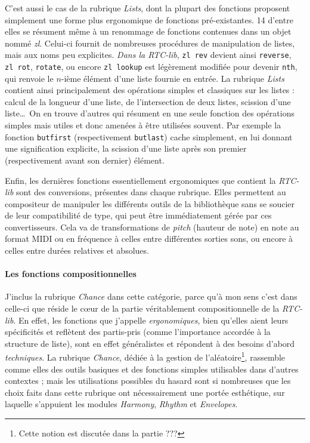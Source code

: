 \documentclass[a4paper,12pt]{article}
\begin{document}
C'est aussi le cas de la rubrique \emph{Lists}, dont la plupart des fonctions proposent simplement une forme plus ergonomique de fonctions pré-existantes. 14 d'entre elles se résument même à un renommage de fonctions contenues dans un objet nommé \emph{zl}. Celui-ci fournit de nombreuses procédures de manipulation de listes, mais aux noms peu explicites. \emph{Dans la RTC-lib}, \texttt{zl~rev} devient ainsi \texttt{reverse}, \texttt{zl~rot}, \texttt{rotate}, ou encore \texttt{zl~lookup} est légèrement modifiée pour devenir \texttt{nth}, qui renvoie le $n$-ième élément d'une liste fournie en entrée. La rubrique \emph{Lists} contient ainsi principalement des opérations simples et classiques sur les listes : calcul de la longueur d'une liste, de l'intersection de deux listes, scission d'une liste\dots~On en trouve d'autres qui résument en une seule fonction des opérations simples mais utiles et donc amenées à être utilisées souvent. Par exemple la fonction \texttt{butfirst} (respectivement \texttt{butlast}) cache simplement, en lui donnant une signification explicite, la scission d'une liste après son premier (respectivement avant son dernier) élément.

Enfin, les dernières fonctions essentiellement ergonomiques que contient la \emph{RTC-lib} sont des conversions, présentes dans chaque rubrique. Elles permettent au compositeur de manipuler les différents outils de la bibliothèque sans se soucier de leur compatibilité de type, qui peut être immédiatement gérée par ces convertisseurs. Cela va de transformations de \emph{pitch} (hauteur de note) en note au format MIDI ou en fréquence à celles entre différentes sorties sons, ou encore à celles entre durées relatives et absolues.

\paragraph{Les fonctions compositionnelles \\}

J'inclus la rubrique \emph{Chance} dans cette catégorie, parce qu'à mon sens c'est dans celle-ci que réside le cœur de la partie véritablement compositionnelle de la \emph{RTC-lib}. En effet, les fonctions que j'appelle \emph{ergonomiques}, bien qu'elles aient leurs spécificités et reflètent des partis-pris (comme l'importance accordée à la structure de liste), sont en effet généralistes et répondent à des besoins d'abord \emph{techniques}. La rubrique \emph{Chance}, dédiée à la gestion de l'aléatoire\footnote{Cette notion est discutée dans la partie ???}, rassemble comme elles des outils basiques et des fonctions simples utilisables dans d'autres contextes ; mais les utilisations possibles du hasard sont si nombreuses que les choix faits dans cette rubrique ont nécessairement une portée esthétique, sur laquelle s'appuient les modules \emph{Harmony}, \emph{Rhythm} et \emph{Envelopes}.
\end{document}
